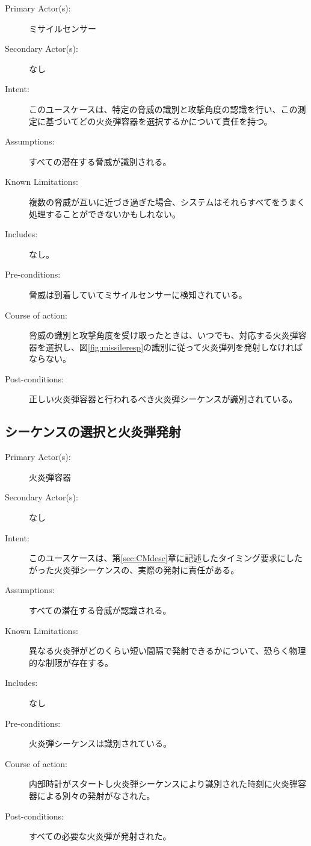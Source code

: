 \documentclass[\pformat,12pt]{jreport}
\begin{document}
\begin{description}
\item[Primary Actor(s):] ミサイルセンサー
\item[Secondary Actor(s):] なし
\item[Intent:] このユースケースは、特定の脅威の識別と攻撃角度の認識を行い、この測定に基づいてどの火炎弾容器を選択するかについて責任を持つ。
\item[Assumptions:] すべての潜在する脅威が識別される。
\item[Known Limitations:] 複数の脅威が互いに近づき過ぎた場合、システムはそれらすべてをうまく処理することができないかもしれない。
\item[Includes:] なし。
\item[Pre-conditions:] 脅威は到着していてミサイルセンサーに検知されている。
\item[Course of action:] 脅威の識別と攻撃角度を受け取ったときは、いつでも、対応する火炎弾容器を選択し、図\ref{fig:missileresp}の識別に従って火炎弾列を発射しなければならない。
\item[Post-conditions:] 正しい火炎弾容器と行われるべき火炎弾シーケンスが識別されている。
\end{description}

\subsection{シーケンスの選択と火炎弾発射}

\begin{description}
\item[Primary Actor(s):] 火炎弾容器
\item[Secondary Actor(s):] なし
\item[Intent:] このユースケースは、第\ref{sec:CMdesc}章に記述したタイミング要求にしたがった火炎弾シーケンスの、実際の発射に責任がある。
\item[Assumptions:] すべての潜在する脅威が認識される。
\item[Known Limitations:] 異なる火炎弾がどのくらい短い間隔で発射できるかについて、恐らく物理的な制限が存在する。
\item[Includes:] なし
\item[Pre-conditions:] 火炎弾シーケンスは識別されている。
\item[Course of action:] 内部時計がスタートし火炎弾シーケンスにより識別された時刻に火炎弾容器による別々の発射がなされた。
\item[Post-conditions:] すべての必要な火炎弾が発射された。
\end{description}
\end{document}
